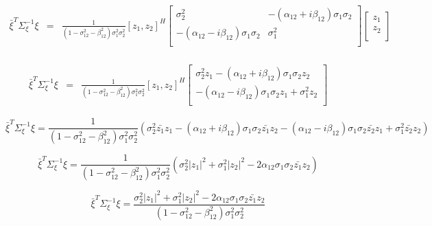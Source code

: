 \documentclass[12pt,a4paper]{article}
\begin{document}
\begin{equation}\label{eqn74}
\begin{array}{ccc}
	\bar{\xi}^{T}\Sigma_{\xi}^{-1}\xi&=&\frac{1}{(1 - \sigma_{12}^{2}- \beta_{12}^2)\sigma_{1}^2\sigma_{2}^2} [z_1,z_2]^{H}\left[
\begin{array}{cc}
	\sigma_2^2                                &  -(\alpha_{12}+i\beta_{12})\sigma_1\sigma_2  \\
	-(\alpha_{12}-i\beta_{12})\sigma_1\sigma_2 & \sigma_1^2 \\
\end{array}
\right]
	\left[
\begin{array}{c}
	z_1  \\
	z_2 \\
\end{array}\right]\\
\end{array}
\end{equation}

\begin{equation}\label{eqn75}
\begin{array}{ccc}
	\bar{\xi}^{T}\Sigma_{\xi}^{-1}\xi&=&\frac{1}{(1 - \sigma_{12}^{2}- \beta_{12}^2)\sigma_{1}^2\sigma_{2}^2} [z_1,z_2]^{H}\left[
\begin{array}{cc}
	\sigma_2^2z_1-(\alpha_{12}+i\beta_{12})\sigma_1\sigma_2z_2  \\
	-(\alpha_{12}-i\beta_{12})\sigma_1\sigma_2z_1+\sigma_1^2z_2 \\
\end{array}
\right]
\end{array}
\end{equation}

\begin{equation}\label{eqn76}
	\bar{\xi}^{T}\Sigma_{\xi}^{-1}\xi=\frac{1}{(1 - \sigma_{12}^{2}- \beta_{12}^2)\sigma_{1}^2\sigma_{2}^2}\left(
	\sigma_2^2\bar{z_1}z_1-(\alpha_{12}+i\beta_{12})\sigma_1\sigma_2\bar{z_1}z_2 
	-(\alpha_{12}-i\beta_{12})\sigma_1\sigma_2\bar{z_2}z_1+\sigma_1^2\bar{z_2}z_2 \right)
\end{equation}

\begin{equation}\label{eqn77}
	\bar{\xi}^{T}\Sigma_{\xi}^{-1}\xi=\frac{1}{(1 - \sigma_{12}^{2}- \beta_{12}^2)\sigma_{1}^2\sigma_{2}^2}\left(
	\sigma_2^2|z_1|^2+\sigma_1^2|z_2|^2-2\alpha_{12}\sigma_1\sigma_2\bar{z_1}z_2 	\right)
\end{equation}

\begin{equation}\label{eqn78}
	\bar{\xi}^{T}\Sigma_{\xi}^{-1}\xi=\frac{\sigma_2^2|z_1|^2+\sigma_1^2|z_2|^2-2\alpha_{12}\sigma_1\sigma_2\bar{z_1}z_2}{(1 - \sigma_{12}^{2}- \beta_{12}^2)\sigma_{1}^2\sigma_{2}^2}
\end{equation}
\end{document}
